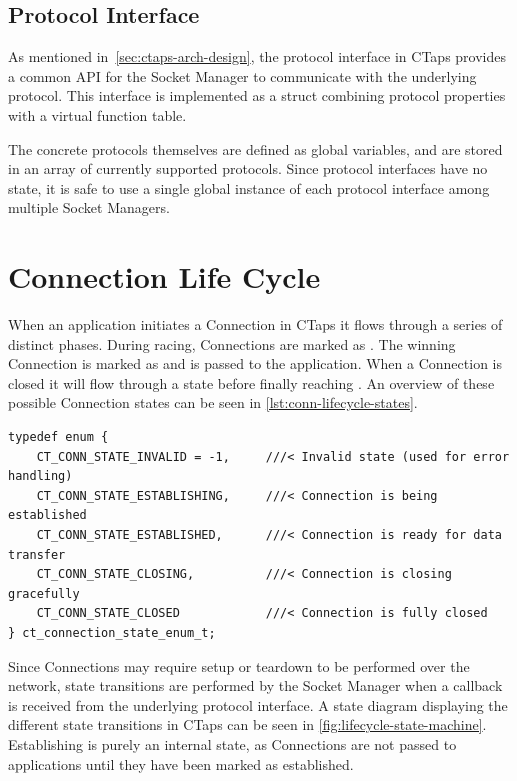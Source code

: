 \subsection{Protocol Interface}
As mentioned in~\cref{sec:ctaps-arch-design}, the protocol interface
in CTaps provides a common API for the Socket Manager to communicate with the
underlying protocol.
This interface is implemented as a struct combining protocol properties with a
virtual function table.

The concrete protocols themselves are defined as global variables,
and are stored in an array of currently supported protocols.
Since protocol interfaces have no state, it is safe to use a
single global instance of each protocol interface among multiple Socket Managers.

\section{Connection Life Cycle}
When an application initiates a Connection in CTaps it flows through
a series of distinct phases. During racing, Connections are marked
as . The winning Connection is marked as 
and is passed to the application. When a Connection is closed it will
flow through a  state before finally reaching .
An overview of these possible Connection states can be seen in \cref{lst:conn-lifecycle-states}.

\begin{listing}[htbp]
  \begin{verbatim}
typedef enum {
    CT_CONN_STATE_INVALID = -1,     ///< Invalid state (used for error handling)
    CT_CONN_STATE_ESTABLISHING,     ///< Connection is being established
    CT_CONN_STATE_ESTABLISHED,      ///< Connection is ready for data transfer
    CT_CONN_STATE_CLOSING,          ///< Connection is closing gracefully
    CT_CONN_STATE_CLOSED            ///< Connection is fully closed
} ct_connection_state_enum_t;
  \end{verbatim}
  \caption[Connection life cycle states]{Connection life cycle states.}
  \label{lst:conn-lifecycle-states}
\end{listing}

Since Connections may require setup or teardown to be performed over
the network, state transitions are performed by the Socket Manager
when a callback is received from the underlying protocol interface.
A state diagram displaying the different state transitions in CTaps
can be seen in \cref{fig:lifecycle-state-machine}. Establishing
is purely an internal state, as Connections are not passed to applications
until they have been marked as established.

